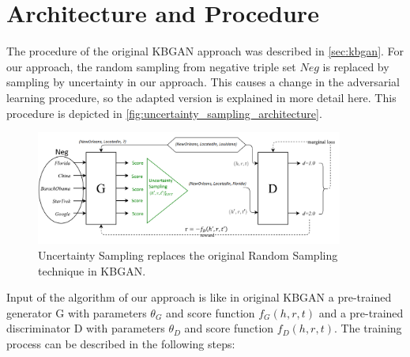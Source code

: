
\section{Architecture and Procedure} 
\label{sec:architecture_and_procedure}

The procedure of the original KBGAN approach was described in \autoref{sec:kbgan}.
For our approach, the random sampling from negative triple set $Neg$ is replaced by sampling by uncertainty in our approach.
This causes a change in the adversarial learning procedure, so the adapted version is explained in more detail here.
This procedure is depicted in \autoref{fig:uncertainty_sampling_architecture}.
\begin{figure}[t]
  \centering
    \includegraphics[width=0.90\textwidth]{figures/architecture.png}
  \caption{Uncertainty Sampling replaces the original Random Sampling technique in \ac{KBGAN}.}
  \label{fig:uncertainty_sampling_architecture}
\end{figure}
Input of the algorithm of our approach is like in original \ac{KBGAN} a pre-trained generator G with parameters $\theta_G$ and score function $f_G(h,r,t)$ and a pre-trained discriminator D with parameters $\theta_D$ and score function $f_D(h,r,t)$.
The training process can be described in the following steps:

